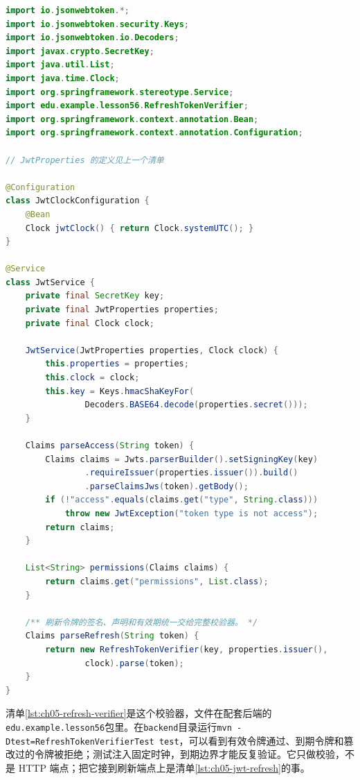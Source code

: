 \begin{lstlisting}[label={lst:online-ch05-jwt-parse},language=Java,caption={jjwt 0.11.x 签名验证与访问令牌解析}]
import io.jsonwebtoken.*;
import io.jsonwebtoken.security.Keys;
import io.jsonwebtoken.io.Decoders;
import javax.crypto.SecretKey;
import java.util.List;
import java.time.Clock;
import org.springframework.stereotype.Service;
import edu.example.lesson56.RefreshTokenVerifier;
import org.springframework.context.annotation.Bean;
import org.springframework.context.annotation.Configuration;

// JwtProperties 的定义见上一个清单

@Configuration
class JwtClockConfiguration {
    @Bean
    Clock jwtClock() { return Clock.systemUTC(); }
}

@Service
class JwtService {
    private final SecretKey key;
    private final JwtProperties properties;
    private final Clock clock;

    JwtService(JwtProperties properties, Clock clock) {
        this.properties = properties;
        this.clock = clock;
        this.key = Keys.hmacShaKeyFor(
                Decoders.BASE64.decode(properties.secret()));
    }

    Claims parseAccess(String token) {
        Claims claims = Jwts.parserBuilder().setSigningKey(key)
                .requireIssuer(properties.issuer()).build()
                .parseClaimsJws(token).getBody();
        if (!"access".equals(claims.get("type", String.class)))
            throw new JwtException("token type is not access");
        return claims;
    }

    List<String> permissions(Claims claims) {
        return claims.get("permissions", List.class);
    }

    /** 刷新令牌的签名、声明和有效期统一交给完整校验器。 */
    Claims parseRefresh(String token) {
        return new RefreshTokenVerifier(key, properties.issuer(),
                clock).parse(token);
    }
}
\end{lstlisting}

清单\ref{lst:ch05-refresh-verifier}是这个校验器，文件在配套后端的\texttt{edu.example.lesson56}包里。在\texttt{backend}目录运行\texttt{mvn -Dtest=RefreshTokenVerifierTest test}，可以看到有效令牌通过、到期令牌和篡改过的令牌被拒绝；测试注入固定时钟，到期边界才能反复验证。它只做校验，不是 HTTP 端点；把它接到刷新端点上是清单\ref{lst:ch05-jwt-refresh}的事。


